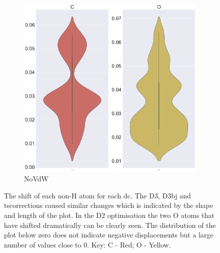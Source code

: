 \begin{figure}
\begin{subfigure}{0.45\textwidth}
\centering
\includegraphics[width=\textwidth]{Figures/Analysis/IVDW/NoVdW_AtomicShift_2.png}
\caption{NoVdW}
\label{fig:StructAnal2_NOVDW}
\end{subfigure}
\captionsetup{font = footnotesize, justification = centering}
\caption[The Shift of each non-H Atom for each Dispersion Correction]{The shift of each non-H atom for each \acrshort{dc}. The D3, D3\acrshort{bj} and \acrshort{ts}corrections caused similar changes which is indicated by the shape and length of the plot. In the D2 optimisation the two O atoms that have shifted dramatically can be clearly seen. The distribution of the plot below zero does not indicate negative displacements but a large number of values close to 0. Key: C - Red; O - Yellow.}
\label{Fig:StructAnal}
\end{figure}

